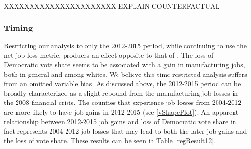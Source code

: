 \documentclass[]{AEA}
\begin{document}
XXXXXXXXXXXXXXXXXXXXXX EXPLAIN COUNTERFACTUAL

\subsubsection{Timing}

Restricting our analysis to only the 2012-2015 period, while continuing
to use the net job loss metric, produces an effect opposite to that of
\cite{Baccini21}. The loss of Democratic vote share seems to be
associated with a gain in manufacturing jobs, both in general and among
whites. We believe this time-restricted analysis suffers from an omitted
variable bias. As discussed above, the 2012-2015 period can be broadly
characterized as a slight rebound from the manufacturing job losses in
the 2008 financial crisis. The counties that experience job losses from
2004-2012 are more likely to have job gains in 2012-2015 (see
\ref{vShapePlot}). An apparent relationship between 2012-2015 job gains
and loss of Democratic vote share in fact represents 2004-2012 job
losses that may lead to both the later job gains and the loss of vote
share. These results can be seen in Table \ref{regResult12}.
\end{document}
